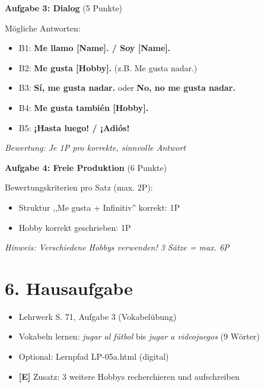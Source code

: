 \documentclass[11pt, a4paper]{article}
\newcommand{\sequenz}{05}
\newcommand{\block}{a}
\newcommand{\E}{\textcolor{erweiterung}{\textbf{[E]}}}
\newcommand{\loesung}[1]{\textcolor{loesung}{\textbf{#1}}}
\begin{document}
\vspace{1em}

\textbf{Aufgabe 3: Dialog} (5 Punkte)

Mögliche Antworten:
\begin{itemize}
    \item B1: \loesung{Me llamo [Name]. / Soy [Name].}
    \item B2: \loesung{Me gusta [Hobby].} (z.B. Me gusta nadar.)
    \item B3: \loesung{Sí, me gusta nadar.} oder \loesung{No, no me gusta nadar.}
    \item B4: \loesung{Me gusta también [Hobby].}
    \item B5: \loesung{¡Hasta luego! / ¡Adiós!}
\end{itemize}

\textit{Bewertung: Je 1P pro korrekte, sinnvolle Antwort}

\vspace{1em}

\textbf{Aufgabe 4: Freie Produktion} (6 Punkte)

Bewertungskriterien pro Satz (max. 2P):
\begin{itemize}
    \item Struktur ,,Me gusta + Infinitiv'' korrekt: 1P
    \item Hobby korrekt geschrieben: 1P
\end{itemize}

\textit{Hinweis: Verschiedene Hobbys verwenden! 3 Sätze = max. 6P}


\section*{6. Hausaufgabe}

\begin{itemize}
    \item Lehrwerk S. 71, Aufgabe 3 (Vokabelübung)
    \item Vokabeln lernen: \textit{jugar al fútbol} bis \textit{jugar a videojuegos} (9 Wörter)
    \item Optional: Lernpfad LP-\sequenz\block.html (digital)
    \item \E{} Zusatz: 3 weitere Hobbys recherchieren und aufschreiben
\end{itemize}
\end{document}
